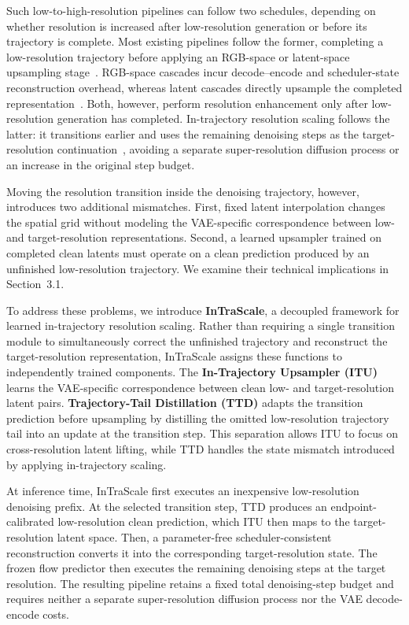 \documentclass[letterpaper]{article} %
\begin{document}
Such low-to-high-resolution pipelines can follow two schedules, depending on whether
resolution is increased after low-resolution generation or before its
trajectory is complete. Most existing pipelines follow the former, completing
a low-resolution trajectory before applying an RGB-space or latent-space
upsampling stage~\citep{ho2022imagenvideo,blattmann2023videoldm,
  wang2023lavie}. RGB-space cascades incur decode--encode and scheduler-state
  reconstruction overhead, whereas latent cascades directly upsample the completed
representation~\citep{xie2025simplegvr,zhao2026luve}. Both, however, perform
resolution enhancement only after low-resolution generation has completed. In-trajectory
resolution scaling follows the latter: it transitions earlier and uses the
remaining denoising steps as the target-resolution
continuation~\citep{jeong2025ralu,lightx2v2026}, avoiding a separate
super-resolution diffusion process or an increase in the original step
budget.

Moving the resolution transition inside the denoising trajectory,
however, introduces two additional mismatches. First, fixed latent
interpolation changes the spatial grid without modeling the
VAE-specific correspondence between low- and target-resolution
representations. Second, a learned upsampler trained on completed clean
latents must operate on a clean prediction produced by an unfinished
low-resolution trajectory. We examine their technical implications in
Section~3.1.

To address these problems, we introduce \textbf{InTraScale}, a
decoupled framework for learned in-trajectory resolution scaling.
Rather than requiring a single transition module to simultaneously
correct the unfinished trajectory and reconstruct the
target-resolution representation, InTraScale assigns these functions
to independently trained components. The \textbf{In-Trajectory
Upsampler (ITU)} learns the VAE-specific correspondence between
clean low- and target-resolution latent pairs.
\textbf{Trajectory-Tail Distillation (TTD)} adapts the transition
prediction before upsampling by distilling the omitted
low-resolution trajectory tail into an update at the transition step. This
separation allows ITU to focus on cross-resolution latent lifting,
while TTD handles the state mismatch introduced by applying in-trajectory scaling.

At inference time, InTraScale first executes an inexpensive
low-resolution denoising prefix. At the selected transition step, TTD
produces an endpoint-calibrated low-resolution clean prediction, which
ITU then maps to the target-resolution latent space. Then, a parameter-free scheduler-consistent
reconstruction converts it into the corresponding target-resolution
state. The frozen flow predictor then
executes the remaining denoising steps at the target resolution. The
resulting pipeline retains a fixed total denoising-step budget and
requires neither a separate super-resolution diffusion process nor the
VAE decode-encode costs.
\end{document}
